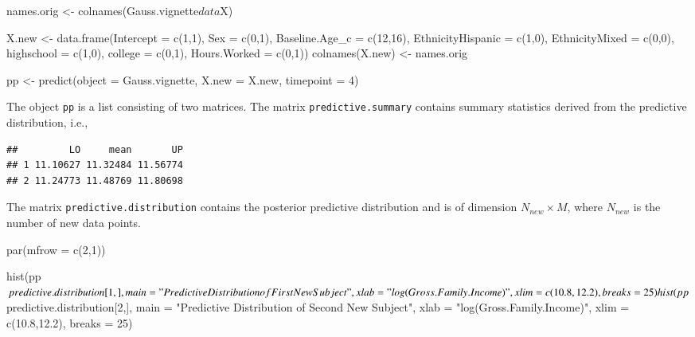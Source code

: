 \documentclass[a4paper, preprint, 3p,
authoryear]{elsarticle} %
\newenvironment{Shaded}{\begin{snugshade}}{\end{snugshade}}
\newcommand{\NormalTok}[1]{#1}
\begin{document}
\begin{Shaded}
\begin{Highlighting}[]
\NormalTok{names.orig \textless{}{-} colnames(Gauss.vignette$data$X)}

\NormalTok{X.new \textless{}{-} data.frame(Intercept = c(1,1),}
\NormalTok{                    Sex = c(0,1),}
\NormalTok{                    Baseline.Age\_c = c(12,16),}
\NormalTok{                    EthnicityHispanic = c(1,0),}
\NormalTok{                    EthnicityMixed = c(0,0),}
\NormalTok{                    highschool = c(1,0),}
\NormalTok{                    college = c(0,1),}
\NormalTok{                    Hours.Worked = c(0,1))}
\NormalTok{colnames(X.new) \textless{}{-} names.orig}

\NormalTok{pp \textless{}{-} predict(object = Gauss.vignette,}
\NormalTok{              X.new = X.new,}
\NormalTok{              timepoint = 4)}
\end{Highlighting}
\end{Shaded}

The object \texttt{pp} is a list consisting of two matrices. The matrix
\texttt{predictive.summary} contains summary statistics derived from the
predictive distribution, i.e.,

\begin{Shaded}
\end{Shaded}

\begin{verbatim}
##         LO     mean       UP
## 1 11.10627 11.32484 11.56774
## 2 11.24773 11.48769 11.80698
\end{verbatim}

The matrix \texttt{predictive.distribution} contains the posterior
predictive distribution and is of dimension \(N_{new} \times M\), where
\(N_{new}\) is the number of new data points.

\begin{Shaded}
\begin{Highlighting}[]
\NormalTok{par(mfrow = c(2,1))}

\NormalTok{hist(pp$predictive.distribution[1,], }
\NormalTok{     main = "Predictive Distribution of First New Subject",}
\NormalTok{     xlab = "log(Gross.Family.Income)",}
\NormalTok{     xlim = c(10.8,12.2),}
\NormalTok{     breaks = 25)}

\NormalTok{hist(pp$predictive.distribution[2,], }
\NormalTok{     main = "Predictive Distribution of Second New Subject",}
\NormalTok{     xlab = "log(Gross.Family.Income)",}
\NormalTok{     xlim = c(10.8,12.2),}
\NormalTok{     breaks = 25)}
\end{Highlighting}
\end{Shaded}
\end{document}
